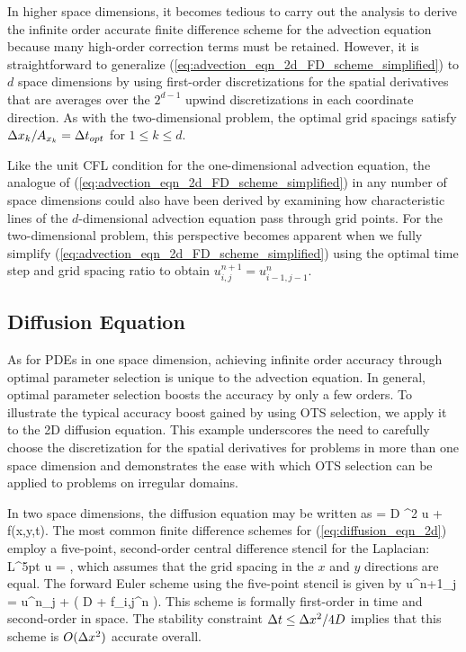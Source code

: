 \documentclass[fleqn,12pt,twoside]{article}
\begin{document}
In higher space dimensions, it becomes tedious to carry out the analysis 
to derive the infinite order accurate finite difference scheme for the 
advection equation because many high-order correction terms must be retained.  
However, it is straightforward to generalize 
(\ref{eq:advection_eqn_2d_FD_scheme_simplified}) to $d$ space dimensions by 
using first-order discretizations for the spatial derivatives that are 
averages over the $2^{d-1}$ upwind discretizations in each coordinate 
direction.   As with the two-dimensional problem, the optimal grid spacings 
satisfy $\Delta x_k/A_{x_k} = \Delta t_{opt}$ for $1 \le k \le d$.

Like the unit CFL condition for the one-dimensional advection equation, the 
analogue of (\ref{eq:advection_eqn_2d_FD_scheme_simplified}) in any number
of space dimensions could also have been derived by examining how 
characteristic lines of the $d$-dimensional advection equation pass 
through grid points.  For the two-dimensional problem, this perspective 
becomes apparent when we fully simplify 
(\ref{eq:advection_eqn_2d_FD_scheme_simplified}) using the 
optimal time step and grid spacing ratio to obtain
$u^{n+1}_{i,j} = u^{n}_{i-1,j-1}$.



\subsection{Diffusion Equation \label{sec:diffusion_eqn_2d}}
As for PDEs in one space dimension, achieving infinite order accuracy 
through optimal parameter selection is unique to the advection equation.
In general, optimal parameter selection boosts the accuracy by only a few 
orders.  To illustrate the typical accuracy boost gained by using OTS
selection, we apply it to the 2D diffusion equation.  This example underscores 
the need to carefully choose the discretization for the spatial derivatives 
for problems in more than one space dimension and demonstrates the ease with 
which OTS selection can be applied to problems on irregular domains.

In two space dimensions, the diffusion equation may be written as
\beq
   = D \nabla^2 u + f(x,y,t).
  \label{eq:diffusion_eqn_2d}
\eeq
The most common finite difference schemes for (\ref{eq:diffusion_eqn_2d}) 
employ a five-point, second-order central difference stencil for the 
Laplacian:
\beq
  L^{5pt} u = ,
  \label{eq:laplacian_2d_5pt_stencil}
\eeq
which assumes that the grid spacing in the $x$ and $y$ directions are
equal.  The forward Euler scheme using the five-point stencil is given by
\beq
  u^{n+1}_j = u^{n}_j 
  + \dt 
    \left( D 
         + f_{i,j}^n
    \right).
  \label{eq:diffusion_eqn_2d_5pt_scheme}
\eeq
This scheme is formally first-order in time and second-order in space.  
The stability constraint $\Delta t \le \Delta x^2/4D$ implies that this scheme is
$O(\Delta x^2)$ accurate overall.
\end{document}
